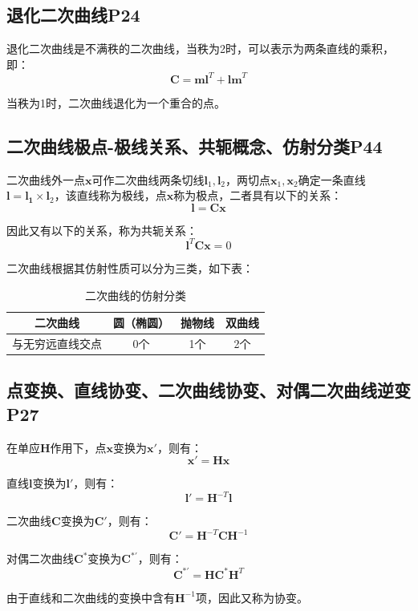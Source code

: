 \documentclass[11pt]{article}
\begin{document}
\subsection{退化二次曲线P24}
退化二次曲线是不满秩的二次曲线，当秩为2时，可以表示为两条直线的乘积，即：
\begin{equation*}
  \mathbold{C}=\mathbold{ml}^T+\mathbold{lm}^T
\end{equation*}\par
当秩为1时，二次曲线退化为一个重合的点。
\subsection{二次曲线极点-极线关系、共轭概念、仿射分类P44}
二次曲线外一点$\mathbold{x}$可作二次曲线两条切线$\mathbold{l}_1,\mathbold{l}_2$，两切点$\mathbold{x}_1,\mathbold{x}_2$确定一条直线$\mathbold{l}=\mathbold{l_1}\times\mathbold{l}_2$，该直线称为极线，点$\mathbold{x}$称为极点，二者具有以下的关系：
\begin{equation*}
  \mathbold{l}=\mathbold{Cx}
\end{equation*}\par
因此又有以下的关系，称为共轭关系：
\begin{equation*}
  \mathbold{l}^T\mathbold{C}\mathbold{x}=0
\end{equation*}\par
二次曲线根据其仿射性质可以分为三类，如下表：
\begin{table}[H]
  \centering
  \caption{二次曲线的仿射分类}
  \begin{tabular}{|c|c|c|c|}
    \hline
    二次曲线     & 圆（椭圆） & 抛物线 & 双曲线 \\
    \hline
    与无穷远直线交点 & 0个    & 1个  & 2个  \\
    \hline
  \end{tabular}
\end{table}
\subsection{点变换、直线协变、二次曲线协变、对偶二次曲线逆变P27}
在单应$\mathbold{H}$作用下，点$\mathbold{x}$变换为$\mathbold{x}'$，则有：
\begin{equation*}
  \mathbold{x}'=\mathbold{Hx}
\end{equation*}\par
直线$\mathbold{l}$变换为$\mathbold{l}'$，则有：
\begin{equation*}
  \mathbold{l}'=\mathbold{H}^{-T}\mathbold{l}
\end{equation*}\par
二次曲线$\mathbold{C}$变换为$\mathbold{C}'$，则有：
\begin{equation*}
  \mathbold{C}'=\mathbold{H}^{-T}\mathbold{CH}^{-1}
\end{equation*}\par
对偶二次曲线$\mathbold{C}^*$变换为$\mathbold{C}^{*'}$，则有：
\begin{equation*}
  \mathbold{C}^{*'}=\mathbold{HC}^*\mathbold{H}^T
\end{equation*}\par
由于直线和二次曲线的变换中含有$\mathbold{H}^{-1}$项，因此又称为协变。
\end{document}
